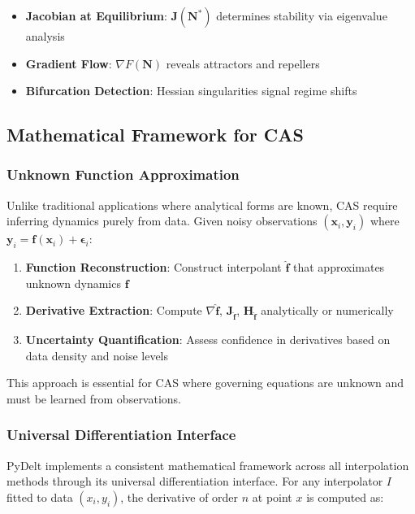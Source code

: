 \documentclass[10pt,journal,compsoc]{IEEEtran}
\begin{document}
\begin{itemize}
    \item \textbf{Jacobian at Equilibrium}: $\mathbf{J}(\mathbf{N}^*)$ determines stability via eigenvalue analysis
    \item \textbf{Gradient Flow}: $\nabla F(\mathbf{N})$ reveals attractors and repellers
    \item \textbf{Bifurcation Detection}: Hessian singularities signal regime shifts
\end{itemize}

\subsection{Mathematical Framework for CAS}

\subsubsection{Unknown Function Approximation}

Unlike traditional applications where analytical forms are known, CAS require inferring dynamics purely from data. Given noisy observations $(\mathbf{x}_i, \mathbf{y}_i)$ where $\mathbf{y}_i = \mathbf{f}(\mathbf{x}_i) + \boldsymbol{\epsilon}_i$:

\begin{enumerate}
    \item \textbf{Function Reconstruction}: Construct interpolant $\hat{\mathbf{f}}$ that approximates unknown dynamics $\mathbf{f}$
    \item \textbf{Derivative Extraction}: Compute $\nabla \hat{\mathbf{f}}$, $\mathbf{J}_{\hat{\mathbf{f}}}$, $\mathbf{H}_{\hat{\mathbf{f}}}$ analytically or numerically
    \item \textbf{Uncertainty Quantification}: Assess confidence in derivatives based on data density and noise levels
\end{enumerate}

This approach is essential for CAS where governing equations are unknown and must be learned from observations.

\subsubsection{Universal Differentiation Interface}

PyDelt implements a consistent mathematical framework across all interpolation methods through its universal differentiation interface. For any interpolator $I$ fitted to data $(x_i, y_i)$, the derivative of order $n$ at point $x$ is computed as:
\end{document}
